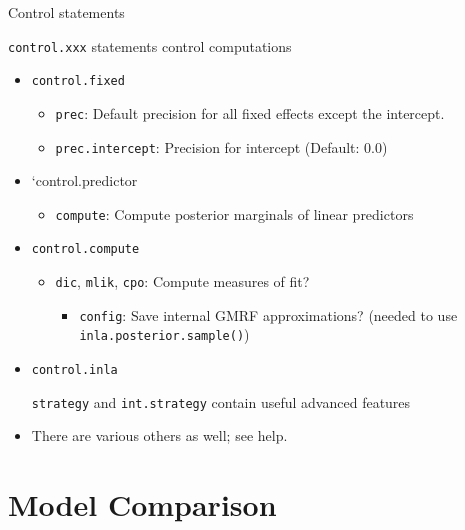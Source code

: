 \documentclass[
  ignorenonframetext,
]{beamer}
\providecommand{\tightlist}{%
  \setlength{\itemsep}{0pt}\setlength{\parskip}{0pt}}
\begin{document}
\begin{frame}[fragile]{Control statements}
\protect\hypertarget{control-statements-1}{}
\small

\texttt{control.xxx} statements control computations

\begin{itemize}
\item
  \texttt{control.fixed}

  \begin{itemize}
  \tightlist
  \item
    \texttt{prec}: Default precision for all fixed effects except the
    intercept.
  \item
    \texttt{prec.intercept}: Precision for intercept (Default: 0.0)
  \end{itemize}
\item
  `control.predictor

  \begin{itemize}
  \tightlist
  \item
    \texttt{compute}: Compute posterior marginals of linear predictors
  \end{itemize}
\item
  \texttt{control.compute}

  \begin{itemize}
  \item
    \texttt{dic}, \texttt{mlik}, \texttt{cpo}: Compute measures of fit?

    \begin{itemize}
    \tightlist
    \item
      \texttt{config}: Save internal GMRF approximations? (needed to use
      \texttt{inla.posterior.sample()})
    \end{itemize}
  \end{itemize}
\item
  \texttt{control.inla}

  \texttt{strategy} and \texttt{int.strategy} contain useful advanced
  features
\item
  There are various others as well; see help.
\end{itemize}

\normalsize
\end{frame}

\hypertarget{model-comparison}{%
\section{Model Comparison}\label{model-comparison}}
\end{document}
